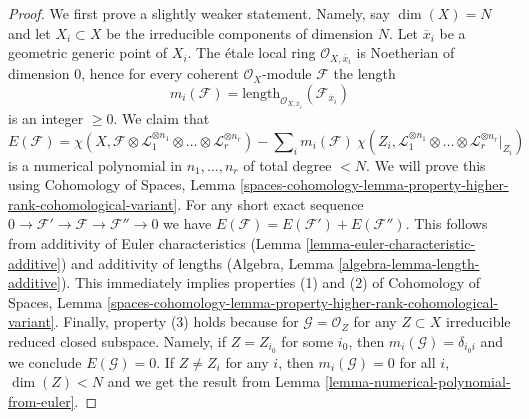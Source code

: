 \documentclass{stacks-project}
\theoremstyle{plain}
\theoremstyle{definition}
\theoremstyle{remark}
\numberwithin{equation}{subsection}
\begin{document}
\begin{proof}
We first prove a slightly weaker statement. Namely, say
$\dim(X) = N$ and let $X_i \subset X$ be the irreducible
components of dimension $N$. Let $\overline{x}_i$ be a geometric
generic point of $X_i$. The \'etale local ring
$\mathcal{O}_{X, \overline{x}_i}$ is Noetherian of
dimension $0$, hence for every coherent $\mathcal{O}_X$-module
$\mathcal{F}$ the length
$$
m_i(\mathcal{F}) = \text{length}_{\mathcal{O}_{X, \overline{x}_i}}
(\mathcal{F}_{\overline{x}_i})
$$
is an integer $\geq 0$. We claim that
$$
E(\mathcal{F}) =
\chi(X, \mathcal{F} \otimes \mathcal{L}_1^{\otimes n_1} \otimes \ldots \otimes
\mathcal{L}_r^{\otimes n_r}) -
\sum\nolimits_i
m_i(\mathcal{F})\ \chi(Z_i, \mathcal{L}_1^{\otimes n_1} \otimes \ldots \otimes
\mathcal{L}_r^{\otimes n_r}|_{Z_i})
$$
is a numerical polynomial in $n_1, \ldots, n_r$ of total degree $< N$.
We will prove this using Cohomology of Spaces, Lemma
\ref{spaces-cohomology-lemma-property-higher-rank-cohomological-variant}.
For any short exact sequence $0 \to \mathcal{F}' \to \mathcal{F} \to
\mathcal{F}'' \to 0$ we have
$E(\mathcal{F}) = E(\mathcal{F}') + E(\mathcal{F}'')$.
This follows from additivity of Euler characteristics
(Lemma \ref{lemma-euler-characteristic-additive})
and additivity of lengths
(Algebra, Lemma \ref{algebra-lemma-length-additive}).
This immediately implies properties (1) and (2) of Cohomology of Spaces, Lemma
\ref{spaces-cohomology-lemma-property-higher-rank-cohomological-variant}.
Finally, property (3) holds because for $\mathcal{G} = \mathcal{O}_Z$
for any $Z \subset X$ irreducible reduced closed subspace.
Namely, if $Z = Z_{i_0}$ for some $i_0$, then
$m_i(\mathcal{G}) = \delta_{i_0i}$ and we conclude $E(\mathcal{G}) = 0$.
If $Z \not = Z_i$ for any $i$, then $m_i(\mathcal{G}) = 0$ for all $i$,
$\dim(Z) < N$ and we get the result from
Lemma \ref{lemma-numerical-polynomial-from-euler}.


\end{proof}
\end{document}
